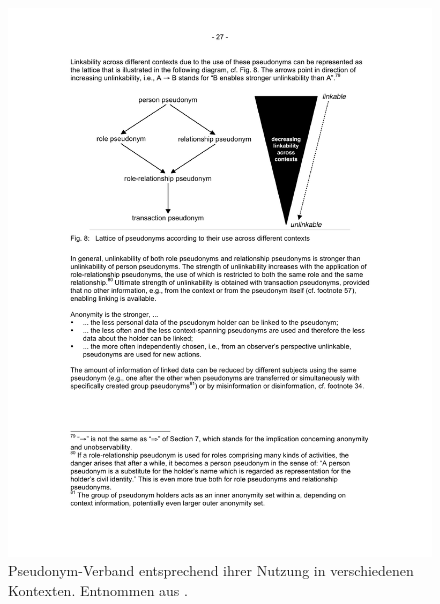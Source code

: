 \begin{figure}[]
    \centering
        \includegraphics[clip, trim=0cm 16.5cm 0cm 4cm, width=1.00\textwidth]{img/pseudonym_lattice_excerpt.pdf}
    \caption{Pseudonym-Verband entsprechend ihrer Nutzung in verschiedenen Kontexten. Entnommen aus \cite{pfitzmann2010}.}
    \label{fig:lattice_pseudonym}
\end{figure}


